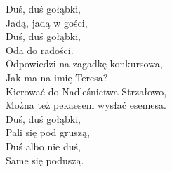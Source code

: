 \begin{text}
Duś, duś gołąbki,\\
Jadą, jadą w gości,\\
Duś, duś gołąbki,\\
Oda do radości.\\

Odpowiedzi na zagadkę konkursowa,\\
Jak ma na imię Teresa?\\
Kierować do Nadleśnictwa Strzałowo,\\
Można też pekaesem wysłać esemesa. \\

Duś, duś gołąbki,\\
Pali się pod gruszą,\\
Duś albo nie duś,\\
Same się poduszą.\\
\end{text}